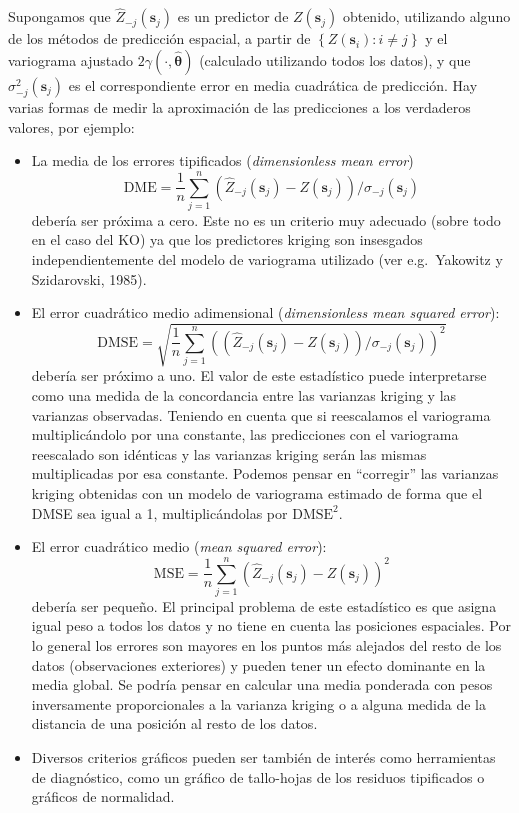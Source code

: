 \documentclass[
]{book}
\theoremstyle{break}
\theoremstyle{definition}
\theoremstyle{definition}
\theoremstyle{definition}
\theoremstyle{definition}
\theoremstyle{remark}
\begin{document}
Supongamos que \(\hat{Z}_{-j}(\mathbf{s}_{j})\) es un predictor de \(Z(\mathbf{s}_{j})\) obtenido, utilizando alguno de los métodos de predicción espacial, a partir de \(\left\{ Z(\mathbf{s}_{i}):i\neq j\right\}\) y el variograma ajustado \(2\gamma(\cdot ,\hat{\boldsymbol{\theta}})\) (calculado utilizando todos los datos), y que \(\sigma_{-j}^2 (\mathbf{s}_{j})\) es el correspondiente error en media cuadrática de predicción.
Hay varias formas de medir la aproximación de las predicciones a los verdaderos valores, por ejemplo:

\begin{itemize}
\item
  La media de los errores tipificados (\emph{dimensionless mean error})
  \[\text{DME} =\dfrac{1}{n} \sum\limits_{j=1}^{n}\left( \hat{Z}_{-j}(\mathbf{s}_{j})-Z(\mathbf{s}_{j})\right) /\sigma_{-j}(\mathbf{s}_{j})\]
  debería ser próxima a cero. Este no es un criterio muy adecuado (sobre todo en el caso del KO) ya que los predictores kriging son insesgados independientemente del modelo de variograma utilizado (ver e.g.~Yakowitz y Szidarovski, 1985).
\item
  El error cuadrático medio adimensional (\emph{dimensionless mean squared error}):
  \[\text{DMSE} =\sqrt{\dfrac{1}{n} \sum\limits_{j=1}^{n}\left( \left( \hat{Z}_{-j}(\mathbf{s}_{j})-Z(\mathbf{s}_{j})\right) /\sigma_{-j}(\mathbf{s}_{j})\right)^2  }\]
  debería ser próximo a uno.
  El valor de este estadístico puede interpretarse como una medida de la concordancia entre las varianzas kriging y las varianzas observadas.
  Teniendo en cuenta que si reescalamos el variograma multiplicándolo por una constante, las predicciones con el variograma reescalado son idénticas y las varianzas kriging serán las mismas multiplicadas por esa constante.
  Podemos pensar en ``corregir'' las varianzas kriging obtenidas con un modelo de variograma estimado de forma que el DMSE sea igual a 1, multiplicándolas por \(\text{DMSE}^2\).
\item
  El error cuadrático medio (\emph{mean squared error}):
  \[\text{MSE} =\dfrac{1}{n} \sum\limits_{j=1}^{n}\left( \hat{Z}_{-j}(\mathbf{s}_{j})-Z(\mathbf{s}_{j})\right)^2\] debería ser pequeño.
  El principal problema de este estadístico es que asigna igual peso a todos los datos y no tiene en cuenta las posiciones espaciales.
  Por lo general los errores son mayores en los puntos más alejados del resto de los datos (observaciones exteriores) y pueden tener un efecto dominante en la media global.
  Se podría pensar en calcular una media ponderada con pesos inversamente proporcionales a la varianza kriging o a alguna medida de la distancia de una posición al resto de los datos.
\item
  Diversos criterios gráficos pueden ser también de interés como herramientas de diagnóstico, como un gráfico de tallo-hojas de los residuos tipificados o gráficos de normalidad.
\end{itemize}
\end{document}
